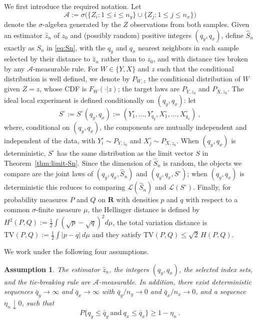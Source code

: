 \documentclass[11pt]{article}
\numberwithin{equation}{section}
\newtheorem{assumption}{Assumption}%
\begin{document}
We first introduce the required notation. Let
\begin{equation*}
 \mathcal A := \sigma\big( \{Z_i : 1\le i\le n_y\} \cup \{Z_j : 1\le j\le n_x\} \big)
\end{equation*}
denote the $\sigma$-algebra generated by the $Z$ observations from both samples. Given an estimator $\hat z_n$ of $z_0$ and (possibly random) positive integers $(q_y,q_x)$, define $\hat S_n$ exactly as $S_n$ in \eqref{eq:Sn}, with the $q_y$ and $q_x$ nearest neighbors in each sample selected by their distance to $\hat z_n$ rather than to $z_0$, and with distance ties broken by any $\mathcal A$-measurable rule. For $W\in\{Y,X\}$ and $z$ such that the conditional distribution is well defined, we denote by $P_{W,z}$ the conditional distribution of $W$ given $Z=z$, whose CDF is $F_W(\cdot|z)$; the target laws are $P_{Y,z_0}$ and $P_{X,z_0}$. The ideal local experiment is defined conditionally on $(q_y,q_x)$: let
\begin{equation}\label{eq:ideal-def}
 S^{\circ} := S^{\circ}(q_y,q_x) := (Y^{\circ}_1,\dots,Y^{\circ}_{q_y},X^{\circ}_1,\dots,X^{\circ}_{q_x})~,
\end{equation}
where, conditional on $(q_y,q_x)$, the components are mutually independent and independent of the data, with $Y^{\circ}_i\sim P_{Y,z_0}$ and $X^{\circ}_j\sim P_{X,z_0}$. When $(q_y,q_x)$ is deterministic, $S^{\circ}$ has the same distribution as the limit vector $S$ in Theorem~\ref{thm:limit-Sn}. Since the dimension of $\hat S_n$ is random, the objects we compare are the joint laws of $(q_y,q_x,\hat S_n)$ and $(q_y,q_x,S^{\circ})$; when $(q_y,q_x)$ is deterministic this reduces to comparing $\mathcal L(\hat S_n)$ and $\mathcal L(S^{\circ})$. Finally, for probability measures $P$ and $Q$ on $\mathbf R$ with densities $p$ and $q$ with respect to a common $\sigma$-finite measure $\mu$, the Hellinger distance is defined by $H^2(P,Q):=\frac12\int(\sqrt{p}-\sqrt{q})^2d\mu$, the total variation distance is $\mathrm{TV}(P,Q):=\tfrac12 \int |p-q|~d\mu$ and they satisfy $\mathrm{TV}(P,Q)\le\sqrt{2}\,H(P,Q)$.

We work under the following four assumptions.

\begin{assumption}\label{ass:A-meas}
The estimator $\hat z_n$, the integers $(q_y,q_x)$, the selected index sets, and the tie-breaking rule are $\mathcal A$-measurable. In addition, there exist deterministic sequences $\bar q_y\to\infty$ and $\bar q_x\to\infty$ with $\bar q_y/n_y\to0$ and $\bar q_x/n_x\to0$, and a sequence $\eta_n\downarrow0$, such that
\begin{equation*}
 P\{q_y\le\bar q_y~\text{and}~q_x\le\bar q_x\}\ge 1-\eta_n~.
\end{equation*}
\end{assumption}
\end{document}
